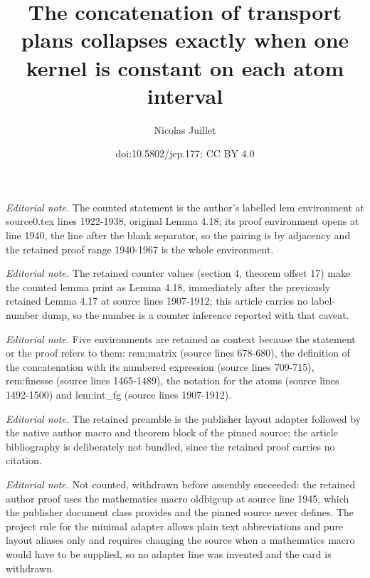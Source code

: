\documentclass[10pt,a4paper]{article}
\title{The concatenation of transport plans collapses exactly when one kernel is constant on each atom interval}
\author{Nicolas Juillet}
\date{doi:10.5802/jep.177; CC BY 4.0}
\theoremstyle{plain}
\theoremstyle{definition}
\begin{document}
\maketitle
\setcounter{section}{4}
\setcounter{them}{10}
\noindent\textit{Editorial note.} The counted statement is the author's labelled lem environment at source0.tex lines 1922-1938, original Lemma 4.18; its proof environment opens at line 1940, the line after the blank separator, so the pairing is by adjacency and the retained proof range 1940-1967 is the whole environment.\par\medskip
\noindent\textit{Editorial note.} The retained counter values (section 4, theorem offset 17) make the counted lemma print as Lemma 4.18, immediately after the previously retained Lemma 4.17 at source lines 1907-1912; this article carries no label-number dump, so the number is a counter inference reported with that caveat.\par\medskip
\noindent\textit{Editorial note.} Five environments are retained as context because the statement or the proof refers to them: rem:matrix (source lines 678-680), the definition of the concatenation with its numbered expression (source lines 709-715), rem:finesse (source lines 1465-1489), the notation for the atoms (source lines 1492-1500) and lem:int\_fg (source lines 1907-1912).\par\medskip
\noindent\textit{Editorial note.} The retained preamble is the publisher layout adapter followed by the native author macro and theorem block of the pinned source; the article bibliography is deliberately not bundled, since the retained proof carries no citation.\par\medskip
\noindent\textit{Editorial note.} Not counted, withdrawn before assembly succeeded: the retained author proof uses the mathematics macro oldbigcup at source line 1945, which the publisher document class provides and the pinned source never defines. The project rule for the minimal adapter allows plain text abbreviations and pure layout aliases only and requires changing the source when a mathematics macro would have to be supplied, so no adapter line was invented and the card is withdrawn.\par\medskip
\end{document}
